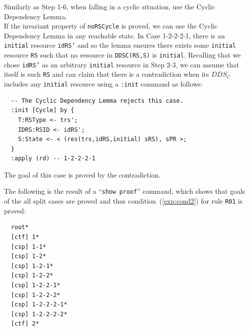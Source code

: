 \documentclass[12pt]{report}
\newcommand{\stt}[1]{{\small{\tt {#1}}}}
\begin{document}
 Similarly as Step 1-6, when falling in a
cyclic situation, use the Cyclic Dependency Lemma. \\
If the invariant property of {\tt noRSCycle} is proved, we can use the
Cyclic Dependency Lemma in any reachable state. In Case 1-2-2-2-1,
there is an {\tt initial} resource {\tt idRS'} and so the lemma ensures
there exists some {\tt initial} resource {\tt RS} such that no
resource in \stt{DDSC(RS,S)} is {\tt initial}. Recalling that we chose
{\tt idRS'} as an arbitrary {\tt initial} resource in Step 2-3, we can
assume that itself is such {\tt RS} and can claim that there is a
contradiction when its $\mathit{DDS_C}$ includes any {\tt initial} resource
using a {\tt :init} command as follows:
\small
\begin{verbatim}
  -- The Cyclic Dependency Lemma rejects this case.
  :init [Cycle] by {
    T:RSType <- trs';
    IDRS:RSID <- idRS';
    S:State <- < (res(trs,idRS,initial) sRS), sPR >;
  }
  :apply (rd) -- 1-2-2-2-1
\end{verbatim}
\normalsize
The goal of this case is proved by the contradiction.

The following is the result of a ``\stt{show proof}'' command, which shows
that goals of the all split cases are proved and thus
condition~(\ref{exp:cond2}) for rule {\tt R01} is proved:
\small
\begin{verbatim}
  root*
  [ctf] 1*
  [csp] 1-1*
  [csp] 1-2*
  [csp] 1-2-1*
  [csp] 1-2-2*
  [csp] 1-2-2-1*
  [csp] 1-2-2-2*
  [csp] 1-2-2-2-1*
  [csp] 1-2-2-2-2*
  [ctf] 2*
\end{verbatim}
\normalsize
\end{document}
